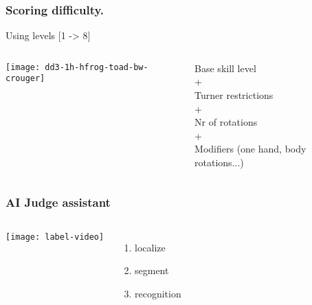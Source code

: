 \documentclass[aspectratio=169]{beamer}
\begin{document}
\begin{frame}
  \frametitle{Scoring difficulty.}
  \vspace{-0.3cm}
  Using levels [1 -> 8]
  \vspace{0.2cm}

  \begin{columns}[c]
  
    \hspace{0.2cm} \texttt{[image: dd3-1h-hfrog-toad-bw-crouger]}

    Base skill level \\
    + \\
    Turner restrictions \\
    + \\
    Nr of rotations \\
    + \\
    Modifiers (one hand, body rotations...)

  \end{columns}
\end{frame}

\begin{frame}
  \frametitle{AI Judge assistant}

  \begin{columns}[c]
  
    \texttt{[image: label-video]}

    \vspace{-1.0cm}
    \begin{enumerate}
      \item localize
      \item segment
      \item recognition
    \end{enumerate}

  \end{columns}
\end{frame}
\end{document}
